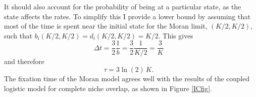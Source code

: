 It should also account for the probability of being at a particular state, as the state affects the rates. 
To simplify this I provide a lower bound by assuming that most of the time is spent near the initial state for the Moran limit, $\left(K/2,K/2\right)$, such that $b_i\left(K/2,K/2\right)=d_i\left(K/2,K/2\right)=K/2$. 
This gives%
\begin{equation}
\Delta t = \frac{3}{2}\frac{1}{b} = \frac{3}{2}\frac{1}{K/2}  = \frac{3}{K}
\end{equation}
and therefore
\begin{equation}
\tau = 3\ln(2)\, K. \label{morantime}
\end{equation}
The fixation time of the Moran model agrees well with the results of the coupled logistic model for complete niche overlap, as shown in Figure \ref{ICfig}. 



\iffalse
